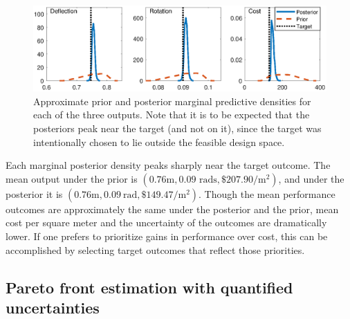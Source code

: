 \documentclass[12pt]{article}
\begin{document}
\begin{figure}[h]
\centering
\includegraphics[scale=0.8]{FIG_prior_vs_posterior_dist}
\caption{Approximate prior and posterior marginal predictive densities for each of the three outputs. Note that it is to be expected that the posteriors peak near the target (and not on it), since the target was intentionally chosen to lie outside the feasible design space.}
\label{fig:prior_post_pred_comp}
\end{figure}
%
Each marginal posterior density peaks sharply near the target outcome.
%
The mean output under the prior is $(0.76\mathrm m,0.09\text{ rads},\$207.90/\mathrm m^2)$, and under the posterior it is $(0.76\mathrm m,0.09\ \mathrm{rad},\$149.47/\mathrm m^2)$.
%
Though the mean performance outcomes are approximately the same under the posterior and the prior, mean cost per square meter and the uncertainty of the outcomes are dramatically lower.
%
If one prefers to prioritize gains in performance over cost, this can be accomplished by selecting target outcomes that reflect those priorities.

\subsection{Pareto front estimation with quantified uncertainties}\label{removing_cal_pars}

\end{document}
